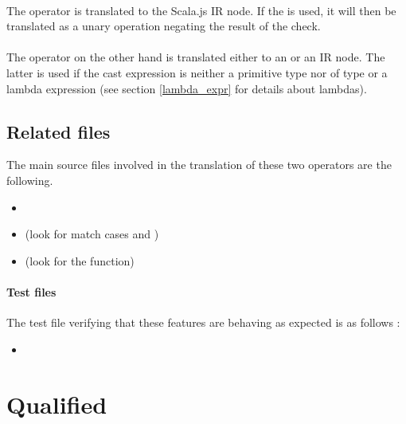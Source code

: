 \paragraph{} The  operator is translated to the Scala.js 
 IR node. If the \ktinline{!} is used, it will then be translated as a 
unary operation negating the result of the check.

\paragraph{} The  operator on the other hand is translated either to an
 or an  IR node. The latter is used if the 
cast expression is neither a primitive type nor of type  or a lambda expression (see 
section \ref{lambda_expr} for details about lambdas).

\subsection{Related files} The main source files involved in the translation of these two 
operators are the following.

\begin{itemize}
 \item {}
 \item {} (look for match cases  and 
)
 \item {} (look for the  function)
\end{itemize}

\paragraph{Test files} The test file verifying that these features are behaving as 
expected is as follows :

\begin{itemize}
 \item {}
\end{itemize}


\section{Qualified } \label{this}

